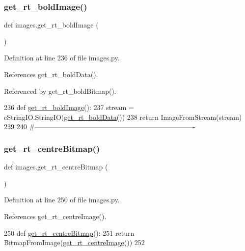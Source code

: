 \subsubsection{\texorpdfstring{get\+\_\+rt\+\_\+bold\+Image()}{get\_rt\_boldImage()}}
{\footnotesize\ttfamily def images.\+get\+\_\+rt\+\_\+bold\+Image (\begin{DoxyParamCaption}{ }\end{DoxyParamCaption})}



Definition at line 236 of file images.\+py.



References get\+\_\+rt\+\_\+bold\+Data().



Referenced by get\+\_\+rt\+\_\+bold\+Bitmap().


\begin{DoxyCode}
236 \textcolor{keyword}{def }\hyperlink{namespaceimages_a8feaea0f04eb5f48edbdd759828ba0ee}{get\_rt\_boldImage}():
237     stream = cStringIO.StringIO(\hyperlink{namespaceimages_a1cee3c739bbfc2c6dceb14468f703c75}{get\_rt\_boldData}())
238     \textcolor{keywordflow}{return} ImageFromStream(stream)
239 
240 \textcolor{comment}{#----------------------------------------------------------------------}
\end{DoxyCode}
\mbox{\label{namespaceimages_a8ab9e3f1594f32159c320cfefd9438cc}} 
\subsubsection{\texorpdfstring{get\+\_\+rt\+\_\+centre\+Bitmap()}{get\_rt\_centreBitmap()}}
{\footnotesize\ttfamily def images.\+get\+\_\+rt\+\_\+centre\+Bitmap (\begin{DoxyParamCaption}{ }\end{DoxyParamCaption})}



Definition at line 250 of file images.\+py.



References get\+\_\+rt\+\_\+centre\+Image().


\begin{DoxyCode}
250 \textcolor{keyword}{def }\hyperlink{namespaceimages_a8ab9e3f1594f32159c320cfefd9438cc}{get\_rt\_centreBitmap}():
251     \textcolor{keywordflow}{return} BitmapFromImage(\hyperlink{namespaceimages_ad0a504a5948c2d661187be424a907f77}{get\_rt\_centreImage}())
252 
\end{DoxyCode}
\mbox{\label{namespaceimages_a80588d0b3c45479bb59dc2e48c1023f4}} 
